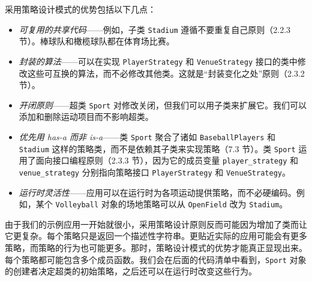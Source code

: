 采用策略设计模式的优势包括以下几点：

\begin{itemize}
\item \emph{可复用的共享代码}——例如，子类 \texttt{Stadium} 遵循不要重复自己原则（2.2.3 节）。棒球队和橄榄球队都在体育场比赛。
\item \emph{封装的算法}——可以在实现 \texttt{Player\allowbreak{}Strategy} 和 \texttt{Venue\allowbreak{}Strategy} 接口的类中修改这些可互换的算法，而不必修改其他类。这就是“封装变化之处”原则（2.3.2 节）。
\item \emph{开闭原则}——超类 \texttt{Sport} 对修改关闭，但我们可以用子类来扩展它。我们可以添加和删除运动项目而不影响超类。
\item \emph{优先用 has-a 而非 is-a}——类 \texttt{Sport} 聚合了诸如 \texttt{Baseball\allowbreak{}Players} 和 \texttt{Stadium} 这样的策略类，而不是依赖其子类来实现策略（7.3 节）。类 \texttt{Sport} 运用了面向接口编程原则（2.3.3 节），因为它的成员变量 \texttt{player\_\allowbreak{}strategy} 和 \texttt{venue\_\allowbreak{}strategy} 分别指向策略接口 \texttt{Player\allowbreak{}Strategy} 和 \texttt{Venue\allowbreak{}Strategy}。
\item \emph{运行时灵活性}——应用可以在运行时为各项运动提供策略，而不必硬编码。例如，某个 \texttt{Volleyball} 对象的场地策略可以从 \texttt{OpenField} 改为 \texttt{Stadium}。
\end{itemize}


由于我们的示例应用一开始就很小，采用策略设计原则反而可能因为增加了类而让它更复杂。每个策略只是返回一个描述性字符串。更贴近实际的应用可能会有更多策略，而策略的行为也可能更多。那时，策略设计模式的优势才能真正显现出来。每个策略都可能包含多个成员函数。我们会在后面的代码清单中看到，\texttt{Sport} 对象的创建者决定超类的初始策略，之后还可以在运行时改变这些行为。

